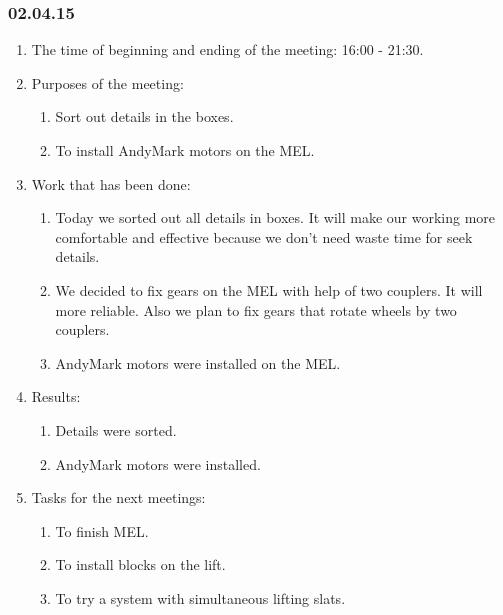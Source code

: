 \subsubsection{02.04.15}
\begin{enumerate}
	
	\item The time of beginning and ending of the meeting: 16:00 - 21:30.
	
	\item Purposes of the meeting: 
	\begin{enumerate}
		
		\item Sort out details in the boxes.
		
		\item To install AndyMark motors on the MEL.

	\end{enumerate}

	\item Work that has been done:
	\begin{enumerate}
		
		\item Today we sorted out all details in boxes. It will make our working more comfortable and effective because we don't need waste time for seek details.
		
		\item We decided to fix gears on the MEL with help of two couplers. It will more reliable. Also we plan to fix gears that rotate wheels by two couplers.
		
        \item AndyMark motors were installed on the MEL.
	\end{enumerate}   
	
	\item Results:
	\begin{enumerate}
		
		\item Details were sorted.
		
		\item AndyMark motors were installed.
		
	\end{enumerate}
	
	\item Tasks for the next meetings:
	\begin{enumerate}
		
		\item To finish MEL.
		
		\item To install blocks on the lift.
		
        \item To try a system with simultaneous lifting slats.
			
	\end{enumerate}
\end{enumerate}
\fillpage
